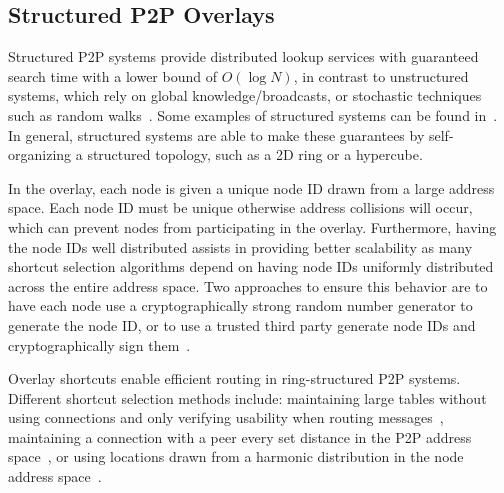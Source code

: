 \documentclass[letterpaper,twocolumn,10pt]{article}
\begin{document}
\subsection{Structured P2P Overlays}
Structured P2P systems provide distributed lookup services with guaranteed
search time with a lower bound of $O(\log N)$, in contrast to unstructured
systems, which rely on global knowledge/broadcasts, or stochastic techniques
such as random walks~\cite{unstructured_v_structured}.  Some examples of
structured systems can be found in~\cite{pastry, chord, symphony, kademlia,
can, dynamo}.  In general, structured systems are able to make these guarantees by
self-organizing a structured topology, such as a 2D ring or a hypercube.

In the overlay, each node is given a unique node ID drawn from a large address
space.  Each node ID must be unique otherwise address collisions will occur,
which can prevent nodes from participating in the overlay.  Furthermore, having
the node IDs well distributed assists in providing better scalability as many
shortcut selection algorithms depend on having node IDs uniformly distributed
across the entire address space.  Two approaches to ensure this behavior are
to have each node use a cryptographically strong random number generator to
generate the node ID, or to use a trusted third party generate node IDs and
cryptographically sign them~\cite{secure_routing}.

%

Overlay shortcuts enable efficient routing in ring-structured P2P systems.
Different shortcut selection methods include: maintaining large tables without
using connections and only verifying usability when routing
messages~\cite{pastry, kademlia}, maintaining a connection with a peer every
set distance in the P2P address space~\cite{chord}, or using locations drawn
from a harmonic distribution in the node address space~\cite{symphony}.
\end{document}
